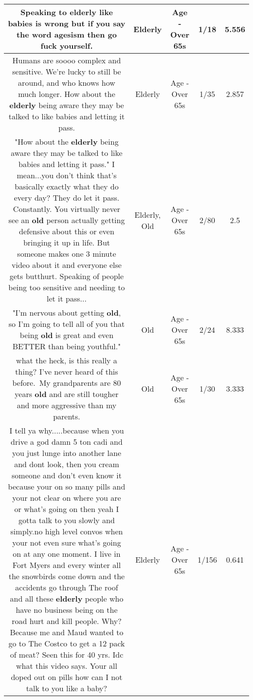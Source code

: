 \documentclass[11pt]{article}
\newlength\mylength
\begin{document}
\begin{center}
\begin{longtable}{|C{.65\mylength}|C{.30\mylength}|C{.12\mylength}|C{.12\mylength}|C{.12\mylength}|}
  \small Speaking to \textbf{elderly} like babies is wrong but if you say the word agesism then go fuck yourself.\normalsize   & Elderly & Age - Over 65s & 1/18 & 5.556 \\  \hline
  \small Humans are soooo complex and sensitive. We're lucky to still be around, and who knows how much longer. How about the \textbf{elderly} being aware they may be talked to like babies and letting it pass.\normalsize   & Elderly & Age - Over 65s & 1/35 & 2.857 \\  \hline
  \small "How about the \textbf{elderly} being aware they may be talked to like babies and letting it pass." I mean...you don't think that's basically exactly what they do every day? They do let it pass. Constantly. You virtually never see an \textbf{old} person actually getting defensive about this or even bringing it up in life. But someone makes one 3 minute video about it and everyone else gets butthurt. Speaking of people being too sensitive and needing to let it pass...\normalsize   & Elderly, Old & Age - Over 65s & 2/80 & 2.5 \\  \hline
  \small "I'm nervous about getting \textbf{old}, so I'm going to tell all of you that being \textbf{old} is great and even BETTER than being youthful."\normalsize   & Old & Age - Over 65s & 2/24 & 8.333 \\  \hline
  \small what the heck, is this really a thing? I've never heard of this before. My grandparents are 80 years \textbf{old} and are still tougher and more aggressive than my parents.\normalsize   & Old & Age - Over 65s & 1/30 & 3.333 \\  \hline
  \small I tell ya why.....because when you drive a god damn 5 ton cadi and you just lunge into another lane and dont look, then you cream someone and don't even know it because your on so many pills and your not clear on where you are or what's going on then yeah I gotta talk to you slowly and simply.no high level convos when your not even sure what's going on at any one moment. I live in Fort Myers and every winter all the snowbirds come down and the accidents go through The  roof and all these \textbf{elderly} people who have no business being on the road hurt and kill people. Why? Because me and Maud wanted to go to The Costco to get a 12 pack of meat? Seen this for 40 yrs. Idc what this video says. Your all doped out on pills how can I not talk to you like a baby?\normalsize   & Elderly & Age - Over 65s & 1/156 & 0.641 \\  \hline

\end{longtable}
\end{center}
\end{document}
